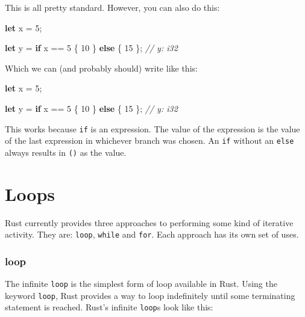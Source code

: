 \documentclass[a4paper,]{book}
\newenvironment{Shaded}{\begin{snugshade}}{\end{snugshade}}
\newcommand{\KeywordTok}[1]{\textcolor[rgb]{0.13,0.29,0.53}{\textbf{{#1}}}}
\newcommand{\DecValTok}[1]{\textcolor[rgb]{0.00,0.00,0.81}{{#1}}}
\newcommand{\CommentTok}[1]{\textcolor[rgb]{0.56,0.35,0.01}{\textit{{#1}}}}
\newcommand{\NormalTok}[1]{{#1}}
\begin{document}
This is all pretty standard. However, you can also do this:

\begin{Shaded}
\begin{Highlighting}[]
\KeywordTok{let} \NormalTok{x = }\DecValTok{5}\NormalTok{;}

\KeywordTok{let} \NormalTok{y = }\KeywordTok{if} \NormalTok{x == }\DecValTok{5} \NormalTok{\{}
    \DecValTok{10}
\NormalTok{\} }\KeywordTok{else} \NormalTok{\{}
    \DecValTok{15}
\NormalTok{\}; }\CommentTok{// y: i32}
\end{Highlighting}
\end{Shaded}

Which we can (and probably should) write like this:

\begin{Shaded}
\begin{Highlighting}[]
\KeywordTok{let} \NormalTok{x = }\DecValTok{5}\NormalTok{;}

\KeywordTok{let} \NormalTok{y = }\KeywordTok{if} \NormalTok{x == }\DecValTok{5} \NormalTok{\{ }\DecValTok{10} \NormalTok{\} }\KeywordTok{else} \NormalTok{\{ }\DecValTok{15} \NormalTok{\}; }\CommentTok{// y: i32}
\end{Highlighting}
\end{Shaded}

This works because \texttt{if} is an expression. The value of the
expression is the value of the last expression in whichever branch was
chosen. An \texttt{if} without an \texttt{else} always results in
\texttt{()} as the value.

\section{Loops}\label{sec--loops}

Rust currently provides three approaches to performing some kind of
iterative activity. They are: \texttt{loop}, \texttt{while} and
\texttt{for}. Each approach has its own set of uses.

\subsubsection{loop}\label{loop}

The infinite \texttt{loop} is the simplest form of loop available in
Rust. Using the keyword \texttt{loop}, Rust provides a way to loop
indefinitely until some terminating statement is reached. Rust's
infinite \texttt{loop}s look like this:
\end{document}
